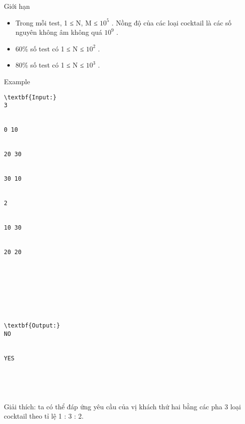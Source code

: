Giới hạn
\begin{itemize}
	\item     Trong mỗi test, 1 ≤ N, M ≤ $10^{5}$    . Nồng độ của các loại cocktail là các số nguyên không âm không quá $10^{9}$    .   
	\item     60\% số test có 1 ≤ N ≤ $10^{2}$    .   
	\item     80\% số test có 1 ≤ N ≤ $10^{3}$    .   
\end{itemize}
Example
\begin{verbatim}
\textbf{Input:}
3


0 10


20 30 


30 10


2


10 30


20 20








\textbf{Output:}
NO


YES





\end{verbatim}

Giải thích: ta có thể đáp ứng yêu cầu của vị khách thứ hai bằng các pha 3 loại cocktail theo tỉ lệ 1 : 3 : 2.